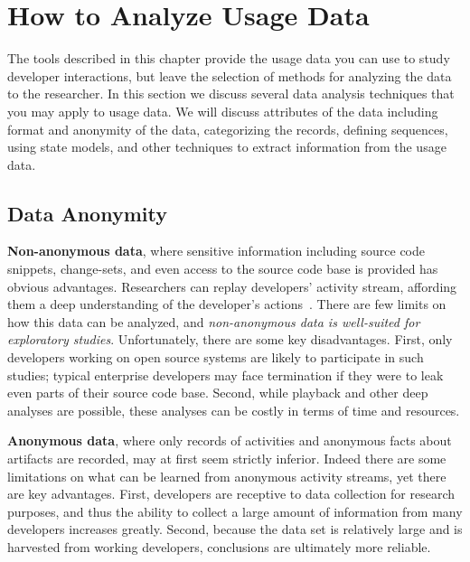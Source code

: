 \section{How to Analyze Usage Data}

The tools described in this chapter provide the usage data you can use to study developer interactions, but leave the selection of methods for analyzing the data to the researcher.  In this section we discuss several data analysis techniques that you may apply to usage data.  We will discuss attributes of the data including format and anonymity of the data, categorizing the records, defining sequences, using state models, and other techniques to extract information from the usage data. 

\label{sec:dataAnonymity}
\subsection{Data Anonymity}

\noindent
{\bf Non-anonymous data}, where sensitive information including source code snippets, change-sets, and even access to the source code base is provided has obvious advantages. Researchers can replay developers' activity stream, affording them a deep understanding of the developer's actions~. There are few limits on how this data can be analyzed, and {\em non-anonymous data is well-suited for exploratory studies}. Unfortunately, there are some key disadvantages. First, only developers working on open source systems are likely to participate in such studies; typical enterprise developers may face termination if they were to leak even parts of their source code base. Second, while playback and other deep analyses are possible, these analyses can be costly in terms of time and resources. 

\vspace{0.1in}

\noindent
{\bf Anonymous data}, where only records of activities and anonymous facts about artifacts are recorded, may at first seem strictly inferior. Indeed there are some limitations on what can be learned from anonymous activity streams, yet there are key advantages. First, developers are receptive to data collection for research purposes, and thus the ability to collect a large amount of information from many developers increases greatly. Second, because the data set is relatively large and is harvested from working developers, conclusions are ultimately more reliable. 

